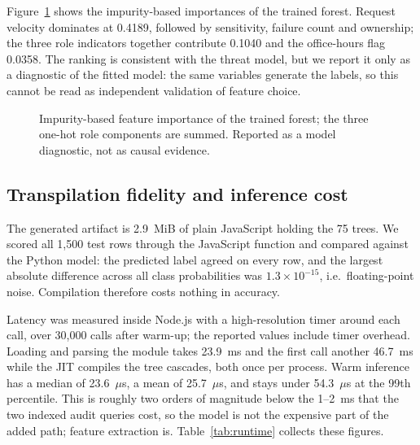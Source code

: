 \documentclass[a4paper,conference]{IEEEtran}
\begin{document}
Figure~\ref{fig:importance} shows the impurity-based importances of the trained forest. Request
velocity dominates at 0.4189, followed by sensitivity, failure count and ownership; the three
role indicators together contribute 0.1040 and the office-hours flag 0.0358. The ranking is
consistent with the threat model, but we report it only as a diagnostic of the fitted model: the
same variables generate the labels, so this cannot be read as independent validation of feature
choice.

\begin{figure}[t]
\centering
{}
\caption{Impurity-based feature importance of the trained forest; the three one-hot role
components are summed. Reported as a model diagnostic, not as causal evidence.}
\label{fig:importance}
\end{figure}

\subsection{Transpilation fidelity and inference cost}
\label{sec:parity}

The generated artifact is 2.9~MiB of plain JavaScript holding the 75 trees. We scored all 1{,}500
test rows through the JavaScript function and compared against the Python model: the predicted
label agreed on every row, and the largest absolute difference across all class probabilities was
$1.3\times10^{-15}$, i.e.\ floating-point noise. Compilation therefore costs nothing in accuracy.

Latency was measured inside Node.js with a high-resolution timer around each call, over 30{,}000
calls after warm-up; the reported values include timer overhead. Loading and parsing the module
takes 23.9~ms and the first call another 46.7~ms while the JIT compiles the tree cascades, both
once per process. Warm inference has a median of 23.6~$\mu$s, a mean of 25.7~$\mu$s, and stays
under 54.3~$\mu$s at the 99th percentile. This is roughly two orders of magnitude below the
1--2~ms that the two indexed audit queries cost, so the model is not the expensive part of the
added path; feature extraction is. Table~\ref{tab:runtime} collects these figures.
\end{document}
